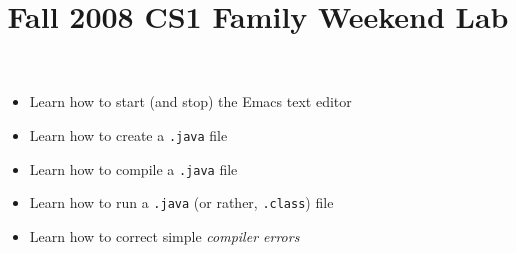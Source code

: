 \documentclass[12pt,twoside]{memoir}
\begin{document}
\title{Fall 2008 CS1 Family Weekend  Lab}
\maketitle

\begin{itemize}
\item Learn how to start (and stop) the Emacs text editor
\item Learn how to create a \texttt{.java} file
\item Learn how to compile a \texttt{.java} file
\item Learn how to run a \texttt{.java} (or rather, \texttt{.class}) file
\item Learn how to correct simple \emph{compiler errors}
\end{itemize}
\end{document}

